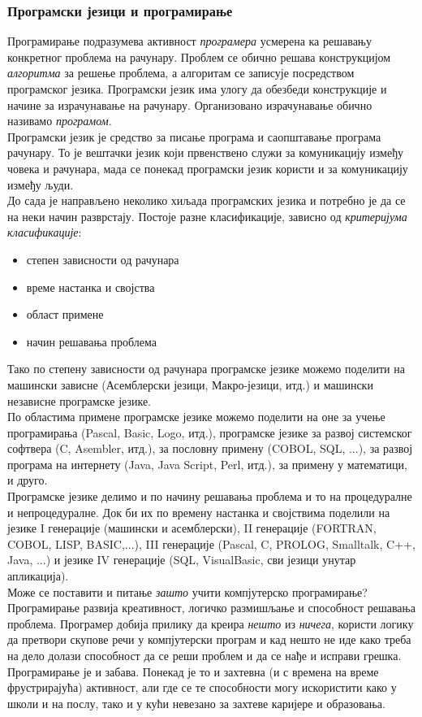 \documentclass[11pt, serbianc, english, titlepage]{article}
\begin{document}
		\subsubsection{Програмски језици и програмирање}
		Програмирање подразумева активност \emph{програмера} усмерена ка решавању конкретног проблема на рачунару. Проблем се обично решава конструкцијом \emph{алгоритма} за решење проблема, а алгоритам се записује посредством програмског језика. Програмски језик има улогу да обезбеди конструкције и начине за израчунавање на рачунару. Организовано израчунавање обично називамо \emph{програмом}.\\
		Програмски језик је средство за писање програма и саопштавање програма рачунару. То је вештачки језик који првенствено служи за комуникацију између човека и рачунара, мада се понекад програмски језик користи и за комуникацију између људи.\\
		 		До сада је направљено неколико хиљада програмских језика и потребно је да се на неки начин разврстају. Постоје разне класификације, зависно од \emph{критеријума класификације}:
		\begin{itemize}
		\item степен зависности од рачунара
		\item време настанка и својства
		\item област примене
		\item начин решавања проблема
		\end{itemize}
		Тако по степену зависности од рачунара програмске језике можемо поделити на машински зависне (Асемблерски језици, Макро-језици, итд.) и машински независне програмске језике.\\
		По областима примене програмске језике можемо поделити на оне за учење програмирања (Pascal, Basic, Logo, итд.), програмске језике за развој системског софтвера (C, Asembler, итд.), за пословну примену (COBOL, SQL, ...), за развој програма на интернету (Java, Java Script, Perl, итд.), за примену у математици, и друго.\\
		Програмске језике делимо и по начину решавања проблема и то на процедуралне и непроцедуралне. Док би их по времену настанка и својствима поделили на језике I генерације (машински и асемблерски), II генерације (FORTRAN, COBOL, LISP, BASIC,...), III генерације (Pascal, C, PROLOG, Smalltalk, C++, Java, ...) и језике IV генерације (SQL, VisualBasic, сви језици унутар апликација).\cite{tosic}\\
		Може се поставити и питање \emph{зашто} учити компјутерско програмирање? Програмирање развија креативност, логичко размишљање и способност решавања проблема. Програмер добија прилику да креира \emph{нешто} из \emph{ничега}, користи логику да претвори скупове речи у компјутерски програм и кад нешто не иде како треба на дело долази способност да се реши проблем и да се нађе и исправи грешка. \\
		Програмирање је и забава. Понекад је то и захтевна (и с времена на време фрустрирајућа) активност, али где се те способности могу искористити како у школи и на послу, тако и у кући невезано за захтеве каријере и образовања.\\
		
\end{document}
